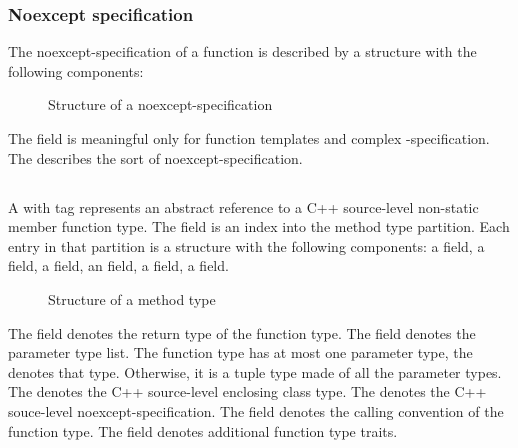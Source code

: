 
\subsubsection{Noexcept specification}
\label{sec:ifc-noexcept-specification}

The noexcept-specification of a function is described by a structure with the following components:
%
\begin{figure}[H]
	\centering
	\caption{Structure of a noexcept-specification}
	\label{fig:ifc-noexception-specification-structure}
\end{figure}
%

The  field is meaningful only for function templates and complex -specification.
The  describes the sort of noexcept-specification. 

\subsection{}
\label{sec:ifc:TypeSort:Method}

A  with tag  represents
an abstract reference to a C++ source-level non-static member function type.
The  field is an index into the method type partition.
Each entry in that partition is a structure with the following components:
a  field, a  field, a  field, an  field,
a  field, a  field.
%
\begin{figure}[H]
	\centering
	\caption{Structure of a method type}
	\label{fig:ifc-method-type-structure}
\end{figure}
%
The  field denotes the return type of the function type.
The  field denotes the parameter type list.  The function type has at most
one parameter type, the  denotes that type. Otherwise, it is a tuple type made
of all the parameter types.
The  denotes the C++ source-level enclosing class type.
The  denotes the C++ souce-level noexcept-specification.
The  field denotes the calling convention of the function type.
The  field denotes additional function type traits.


